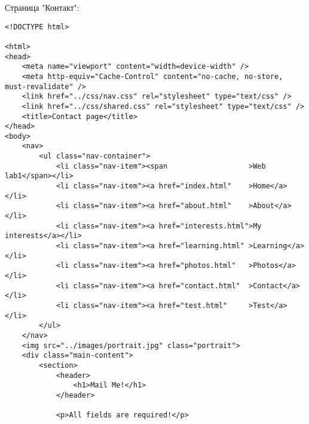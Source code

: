Страница "Контакт":
\begin{lstlisting}
<!DOCTYPE html>

<html>
<head>
    <meta name="viewport" content="width=device-width" />
    <meta http-equiv="Cache-Control" content="no-cache, no-store, must-revalidate" />
    <link href="../css/nav.css" rel="stylesheet" type="text/css" />
    <link href="../css/shared.css" rel="stylesheet" type="text/css" />
    <title>Contact page</title>
</head>
<body>
    <nav>
        <ul class="nav-container">
            <li class="nav-item"><span                   >Web lab1</span></li>
            <li class="nav-item"><a href="index.html"    >Home</a></li>
            <li class="nav-item"><a href="about.html"    >About</a></li>
            <li class="nav-item"><a href="interests.html">My interests</a></li>
            <li class="nav-item"><a href="learning.html" >Learning</a></li>
            <li class="nav-item"><a href="photos.html"   >Photos</a></li>
            <li class="nav-item"><a href="contact.html"  >Contact</a></li>
            <li class="nav-item"><a href="test.html"     >Test</a></li>
        </ul>
    </nav>
    <img src="../images/portrait.jpg" class="portrait">
    <div class="main-content">
        <section>
            <header>
                <h1>Mail Me!</h1>
            </header>

            <p>All fields are required!</p>


\end{lstlisting}

